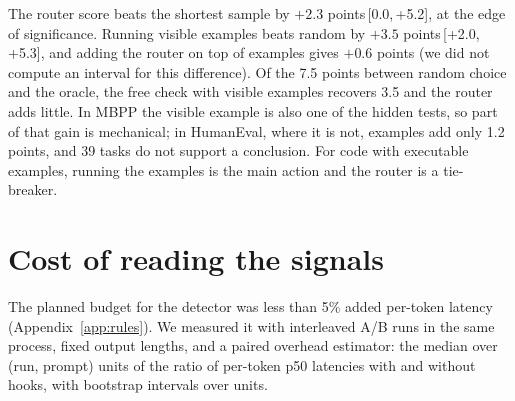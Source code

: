 \documentclass[11pt]{article}
\newcommand{\ci}[2]{\,[#1,\,#2]}
\begin{document}
\begin{table}[t]
\centering
\small
\caption{Best-of-5 selection on 213 gpt-oss test tasks. ``Examples'' first discards samples that fail the visible examples, then applies the policy.}
\label{tab:bestofn}
\end{table}

The router score beats the shortest sample by $+2.3$ points\ci{0.0}{+5.2}, at the edge of significance.
Running visible examples beats random by $+3.5$ points\ci{+2.0}{+5.3}, and adding the router on top of examples gives $+0.6$ points (we did not compute an interval for this difference).
Of the 7.5 points between random choice and the oracle, the free check with visible examples recovers 3.5 and the router adds little.
In MBPP the visible example is also one of the hidden tests, so part of that gain is mechanical; in HumanEval, where it is not, examples add only 1.2 points, and 39 tasks do not support a conclusion.
For code with executable examples, running the examples is the main action and the router is a tie-breaker.

\section{Cost of reading the signals}
\label{sec:latency}

The planned budget for the detector was less than 5\% added per-token latency (Appendix~\ref{app:rules}).
We measured it with interleaved A/B runs in the same process, fixed output lengths, and a paired overhead estimator: the median over (run, prompt) units of the ratio of per-token p50 latencies with and without hooks, with bootstrap intervals over units.
\end{document}
